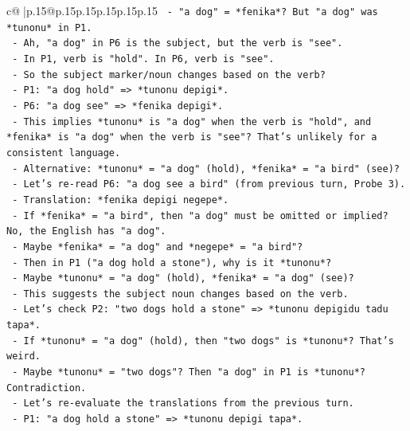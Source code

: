 \documentclass{article}
\begin{document}
{\begin{supertabular}{c@{$\;$}|p{.15\linewidth}@{}p{.15\linewidth}p{.15\linewidth}p{.15\linewidth}p{.15\linewidth}p{.15\linewidth}}
{{{\texttt{                {-} "a dog" = *fenika*? But "a dog" was *tunonu* in P1.} \\
\texttt{                {-} Ah, "a dog" in P6 is the subject, but the verb is "see".} \\
\texttt{                {-} In P1, verb is "hold". In P6, verb is "see".} \\
\texttt{                {-} So the subject marker/noun changes based on the verb?} \\
\texttt{                {-} P1: "a dog hold" => *tunonu depigi*.} \\
\texttt{                {-} P6: "a dog see" => *fenika depigi*.} \\
\texttt{                {-} This implies *tunonu* is "a dog" when the verb is "hold", and *fenika* is "a dog" when the verb is "see"? That's unlikely for a consistent language.} \\
\texttt{                {-} Alternative: *tunonu* = "a dog" (hold), *fenika* = "a bird" (see)?} \\
\texttt{                {-} Let's re{-}read P6: "a dog see a bird" (from previous turn, Probe 3).} \\
\texttt{                {-} Translation: *fenika depigi negepe*.} \\
\texttt{                {-} If *fenika* = "a bird", then "a dog" must be omitted or implied? No, the English has "a dog".} \\
\texttt{                {-} Maybe *fenika* = "a dog" and *negepe* = "a bird"?} \\
\texttt{                {-} Then in P1 ("a dog hold a stone"), why is it *tunonu*?} \\
\texttt{                {-} Maybe *tunonu* = "a dog" (hold), *fenika* = "a dog" (see)?} \\
\texttt{                {-} This suggests the subject noun changes based on the verb.} \\
\texttt{                {-} Let's check P2: "two dogs hold a stone" => *tunonu depigidu tadu tapa*.} \\
\texttt{                  {-} If *tunonu* = "a dog" (hold), then "two dogs" is *tunonu*? That's weird.} \\
\texttt{                  {-} Maybe *tunonu* = "two dogs"? Then "a dog" in P1 is *tunonu*? Contradiction.} \\
\texttt{                {-} Let's re{-}evaluate the translations from the previous turn.} \\
\texttt{                {-} P1: "a dog hold a stone" => *tunonu depigi tapa*.} \\
}}}
\end{supertabular}}
\end{document}
